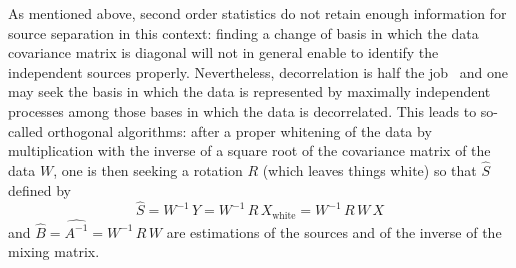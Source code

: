 As mentioned above, second order statistics do not retain enough information for source separation in this context: finding a change of 
basis in which the data covariance matrix is diagonal will not in general enable to identify the independent sources properly. Nevertheless, 
decorrelation is half the job~\citep{ica:tutorial} and one may seek the basis in which the data is represented by maximally independent 
processes among those bases in which the data is decorrelated. This leads to so-called orthogonal algorithms: after a proper whitening of 
the data by multiplication with the inverse of a square root of the covariance matrix of the data $W$, one is then seeking a rotation $R$ 
(which leaves things white) so that $\hat{ S}$ defined by
\begin{equation}
\hat{ S} = W^{-1} \, Y =  W^{-1}\, R \, X_{\textrm{white}}  = W^{-1}\, R \, W \, X 
\end{equation}
and $\hat{B} = \widehat{A^{-1}} =  W^{-1}\, R \, W$ are estimations of the sources and of the inverse of the mixing matrix.\\


